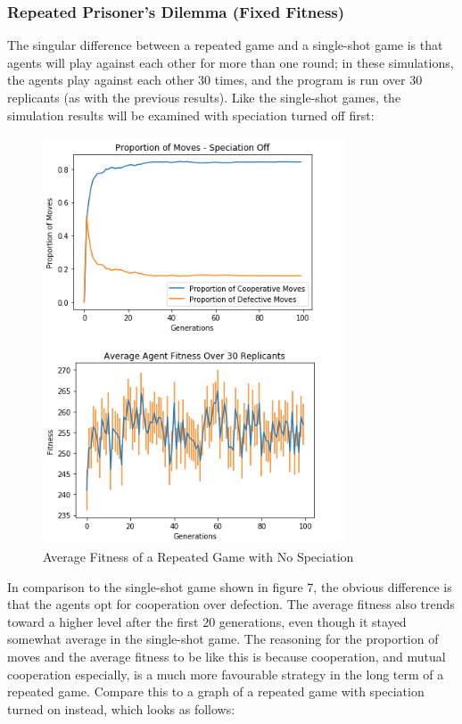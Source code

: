 \documentclass[12pt,a4paper]{article}
\begin{document}
\subsubsection{Repeated Prisoner's Dilemma (Fixed Fitness)}

The singular difference between a repeated game and a single-shot game is that agents will play against each other for more than one round; in these simulations, the agents play against each other 30 times, and the program is run over 30 replicants (as with the previous results). Like the single-shot games, the simulation results will be examined with speciation turned off first:

\begin{figure}[H]
	\centering
		\includegraphics[width=0.80\textwidth]{RepeatedFixedFitnessOff}
		\caption{Average Fitness of a Repeated Game with No Speciation}
\end{figure}

In comparison to the single-shot game shown in figure 7, the obvious difference is that the agents opt for cooperation over defection. The average fitness also trends toward a higher level after the first 20 generations, even though it stayed somewhat average in the single-shot game. The reasoning for the proportion of moves and the average fitness to be like this is because cooperation, and mutual cooperation especially, is a much more favourable strategy in the long term of a repeated game. Compare this to a graph of a repeated game with speciation turned on instead, which looks as follows:
\end{document}
